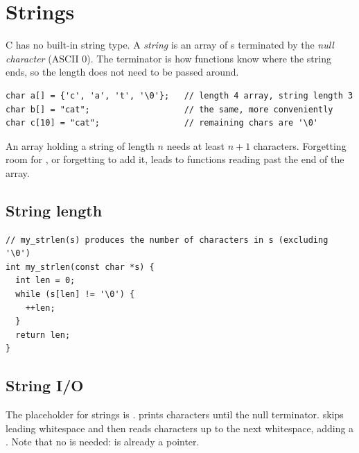\section{Strings}

C has no built-in string type. A \emph{string} is an array of s terminated by the
\emph{null character}  (ASCII 0). The terminator is how functions know
where the string ends, so the length does not need to be passed around.
\begin{lstlisting}[style=c]
char a[] = {'c', 'a', 't', '\0'};   // length 4 array, string length 3
char b[] = "cat";                   // the same, more conveniently
char c[10] = "cat";                 // remaining chars are '\0'
\end{lstlisting}
\begin{center}
\end{center}

\begin{important}
An array holding a string of length $n$ needs at least $n+1$ characters. Forgetting room for
, or forgetting to add it, leads to functions reading past the end of the
array.
\end{important}

\subsection{String length}
\begin{lstlisting}[style=c]
// my_strlen(s) produces the number of characters in s (excluding '\0')
int my_strlen(const char *s) {
  int len = 0;
  while (s[len] != '\0') {
    ++len;
  }
  return len;
}
\end{lstlisting}

\subsection{String I/O}

The placeholder for strings is .  prints characters until the
null terminator.  skips leading whitespace and then reads characters up to
the next whitespace, adding a . Note that no \code{\&} is needed: 
is already a pointer.

